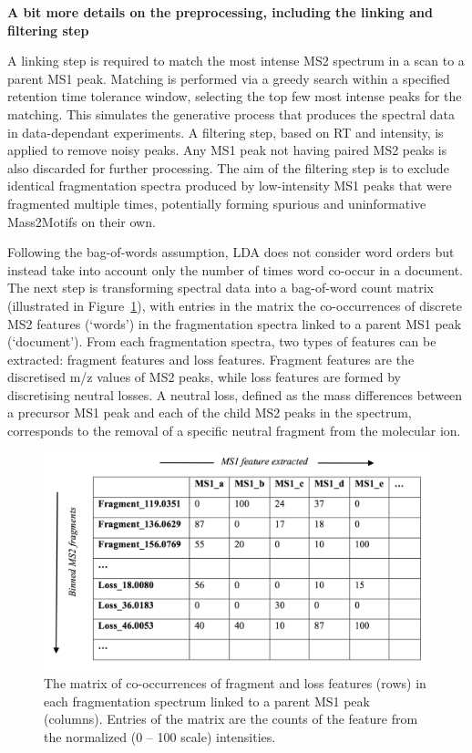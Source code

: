 \textbf{A bit more details on the preprocessing, including the linking and filtering step}

A linking step is required to match the most intense MS2 spectrum in a scan to a parent MS1 peak. Matching is performed via a greedy search within a specified retention time tolerance window, selecting the top few most intense peaks for the matching. This simulates the generative process that produces the spectral data in data-dependant experiments. A filtering step, based on RT and intensity, is applied to remove noisy peaks. Any MS1 peak not having paired MS2 peaks is also discarded for further processing. The aim of the filtering step is to exclude identical fragmentation spectra produced by low-intensity MS1 peaks that were fragmented multiple times, potentially forming spurious and uninformative Mass2Motifs on their own. 

Following the bag-of-words assumption, LDA does not consider word orders but instead take into account only the number of times word co-occur in a document. The next step is transforming spectral data into a bag-of-word count matrix (illustrated in Figure~\ref{fig:m2lda-matrix}), with entries in the matrix the co-occurrences of discrete MS2 features (`words') in the fragmentation spectra linked to a parent MS1 peak (`document'). From each fragmentation spectra, two types of features can be extracted: fragment features and loss features. Fragment features are the discretised m/z values of MS2 peaks, while loss features are formed by discretising neutral losses. A neutral loss, defined as the mass differences between a precursor MS1 peak and each of the child MS2 peaks in the spectrum, corresponds to the removal of a specific neutral fragment from the molecular ion. 

\begin{figure}[!htbp]
\centering\includegraphics[width=0.8\linewidth]{07-lda/figures/matrix.png}
\centering\caption{The matrix of co-occurrences of fragment and loss features (rows) in each fragmentation spectrum linked to a parent MS1 peak (columns). Entries of the matrix are the counts of the feature from the normalized (0 – 100 scale) intensities.\label{fig:m2lda-matrix}}
\end{figure}

